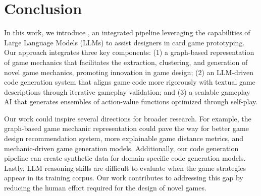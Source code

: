 \section{Conclusion}

In this work, we introduce \ourwork, an integrated pipeline leveraging the capabilities of Large Language Models (LLMs) to assist designers in card game prototyping. Our approach integrates three key components: (1) a graph-based representation of game mechanics that facilitates the extraction, clustering, and generation of novel game mechanics, promoting innovation in game design; (2) an LLM-driven code generation system that aligns game code more rigorously with textual game descriptions through iterative gameplay validation; and (3) a scalable gameplay AI that generates ensembles of action-value functions optimized through self-play.

Our work could inspire several directions for broader research. For example, the graph-based game mechanic representation could pave the way for better game design recommendation system, more explainable game distance metrics, and mechanic-driven game generation models. Additionally, our code generation pipeline can create synthetic data for domain-specific code generation models. Lastly, LLM reasoning skills are difficult to evaluate when the game strategies appear in its training corpus. Our work contributes to addressing this gap by reducing the human effort required for the design of novel games.
